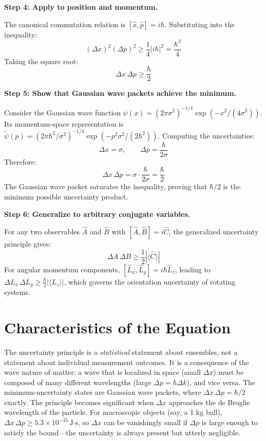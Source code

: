 \textbf{Step 4: Apply to position and momentum.}

The canonical commutation relation is $[\hat{x},\hat{p}] = i\hbar$. Substituting into the inequality:
\begin{equation}
(\Delta x)^2(\Delta p)^2 \geq \frac{1}{4}|i\hbar|^2 = \frac{\hbar^2}{4}
\end{equation}
Taking the square root:
\begin{equation}
\Delta x\,\Delta p \geq \frac{\hbar}{2}
\end{equation}

\textbf{Step 5: Show that Gaussian wave packets achieve the minimum.}

Consider the Gaussian wave function $\psi(x) = (2\pi\sigma^2)^{-1/4}\exp(-x^2/(4\sigma^2))$. Its momentum-space representation is $\tilde{\psi}(p) = (2\pi\hbar^2/\sigma^2)^{-1/4}\exp(-p^2\sigma^2/(2\hbar^2))$. Computing the uncertainties:
\begin{equation}
\Delta x = \sigma, \qquad \Delta p = \frac{\hbar}{2\sigma}
\end{equation}
Therefore:
\begin{equation}
\Delta x\,\Delta p = \sigma \cdot \frac{\hbar}{2\sigma} = \frac{\hbar}{2}
\end{equation}
The Gaussian wave packet saturates the inequality, proving that $\hbar/2$ is the minimum possible uncertainty product.

\textbf{Step 6: Generalize to arbitrary conjugate variables.}

For any two observables $\hat{A}$ and $\hat{B}$ with $[\hat{A},\hat{B}] = i\hat{C}$, the generalized uncertainty principle gives:
\begin{equation}
\Delta A\,\Delta B \geq \frac{1}{2}|\langle\hat{C}\rangle|
\end{equation}
For angular momentum components, $[\hat{L}_x,\hat{L}_y] = i\hbar\hat{L}_z$, leading to $\Delta L_x\,\Delta L_y \geq \frac{\hbar}{2}|\langle L_z\rangle|$, which governs the orientation uncertainty of rotating systems.

\section*{Characteristics of the Equation}

The uncertainty principle is a \emph{statistical} statement about ensembles, not a statement about individual measurement outcomes. It is a consequence of the wave nature of matter: a wave that is localized in space (small $\Delta x$) must be composed of many different wavelengths (large $\Delta p = \hbar\Delta k$), and vice versa. The minimum-uncertainty states are Gaussian wave packets, where $\Delta x\,\Delta p = \hbar/2$ exactly. The principle becomes significant when $\Delta x$ approaches the de Broglie wavelength of the particle. For macroscopic objects (say, a 1 kg ball), $\Delta x\,\Delta p \geq 5.3\times 10^{-35}\,\text{J·s}$, so $\Delta x$ can be vanishingly small if $\Delta p$ is large enough to satisfy the bound---the uncertainty is always present but utterly negligible.
